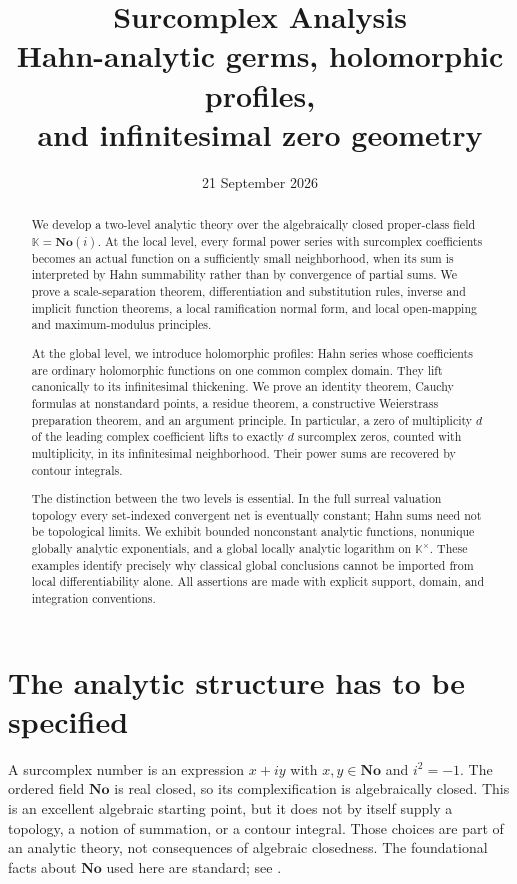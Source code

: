 \documentclass[11pt,a4paper]{article}
\title{\textbf{Surcomplex Analysis}\\[6pt]
\large Hahn-analytic germs, holomorphic profiles,\\
and infinitesimal zero geometry}
\author{}
\date{21 September 2026}
\numberwithin{equation}{section}
\theoremstyle{definition}
\newcommand{\No}{\mathbf{No}}
\newcommand{\K}{\mathbb K}
\begin{document}
\maketitle
\begin{abstract}
We develop a two-level analytic theory over the algebraically closed proper-class
field $\K=\No(i)$. At the local level, every formal power series with surcomplex
coefficients becomes an actual function on a sufficiently small neighborhood,
when its sum is interpreted by Hahn summability rather than by convergence of
partial sums. We prove a scale-separation theorem, differentiation and
substitution rules, inverse and implicit function theorems, a local ramification
normal form, and local open-mapping and maximum-modulus principles.

At the global level, we introduce holomorphic profiles: Hahn series whose
coefficients are ordinary holomorphic functions on one common complex domain.
They lift canonically to its infinitesimal thickening. We prove an identity
theorem, Cauchy formulas at nonstandard points, a residue theorem, a constructive
Weierstrass preparation theorem, and an argument principle. In particular, a zero
of multiplicity $d$ of the leading complex coefficient lifts to exactly $d$
surcomplex zeros, counted with multiplicity, in its infinitesimal neighborhood.
Their power sums are recovered by contour integrals.

The distinction between the two levels is essential. In the full surreal
valuation topology every set-indexed convergent net is eventually constant;
Hahn sums need not be topological limits. We exhibit bounded nonconstant
analytic functions, nonunique globally analytic exponentials, and a global
locally analytic logarithm on $\K^\times$. These examples identify precisely why
classical global conclusions cannot be imported from local differentiability
alone. All assertions are made with explicit support, domain, and integration
conventions.
\end{abstract}
\thispagestyle{empty}
\clearpage
\tableofcontents
\clearpage

\section{The analytic structure has to be specified}

A surcomplex number is an expression $x+iy$ with $x,y\in\No$ and $i^2=-1$.
The ordered field $\No$ is real closed, so its complexification is algebraically
closed. This is an excellent algebraic starting point, but it does not by itself
supply a topology, a notion of summation, or a contour integral. Those choices
are part of an analytic theory, not consequences of algebraic closedness.
The foundational facts about $\No$ used here are standard; see
\cite{Gonshor,Alling,BMder}.
\end{document}
